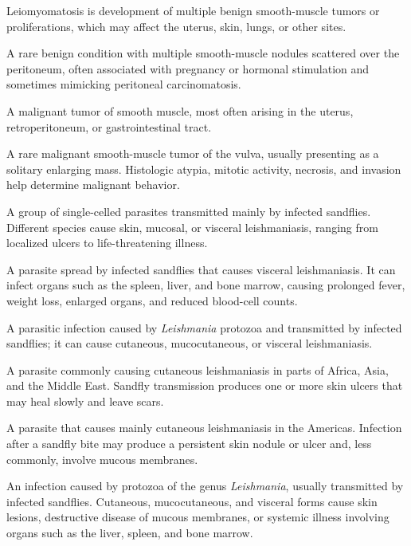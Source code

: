  Leiomyomatosis is development of multiple benign smooth-muscle tumors or proliferations, which may affect the uterus, skin, lungs, or other sites.

 A rare benign condition with multiple smooth-muscle nodules scattered over the peritoneum, often associated with pregnancy or hormonal stimulation and sometimes mimicking peritoneal carcinomatosis.

 A malignant tumor of smooth muscle, most often arising in the uterus, retroperitoneum,
or gastrointestinal tract.

 A rare malignant smooth-muscle tumor of the vulva, usually presenting as a solitary enlarging mass. Histologic atypia, mitotic activity, necrosis, and invasion help determine malignant behavior.

 A group of single-celled parasites transmitted mainly by infected sandflies. Different species cause skin, mucosal, or visceral leishmaniasis, ranging from localized ulcers to life-threatening illness.

 A parasite spread by infected sandflies that causes visceral leishmaniasis. It can infect organs such as the spleen, liver, and bone marrow, causing prolonged fever, weight loss, enlarged organs, and reduced blood-cell counts.

 A parasitic infection caused by \textit{Leishmania} protozoa and transmitted by infected sandflies; it can cause cutaneous, mucocutaneous, or visceral leishmaniasis.

 A parasite commonly causing cutaneous leishmaniasis in parts of Africa, Asia, and the Middle East. Sandfly transmission produces one or more skin ulcers that may heal slowly and leave scars.

 A parasite that causes mainly cutaneous leishmaniasis in the Americas. Infection after a sandfly bite may produce a persistent skin nodule or ulcer and, less commonly, involve mucous membranes.

 An infection caused by protozoa of the genus \textit{Leishmania}, usually transmitted by infected sandflies. Cutaneous, mucocutaneous, and visceral forms cause skin lesions, destructive disease of mucous membranes, or systemic illness involving organs such as the liver, spleen, and bone marrow.

